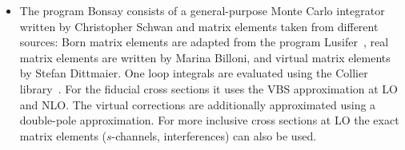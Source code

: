 \documentclass[twocolumn,epjc3]{svjour3} %
\begin{document}
     \begin{itemize} 

    \item The program {\sc Bonsay} consists of a general-purpose Monte Carlo integrator written by Christopher Schwan and matrix elements taken from different sources:
    Born matrix elements are adapted from the program {\sc Lusifer}~\cite{Dittmaier:2002ap}, real matrix elements are written by Marina Billoni, and virtual matrix elements by Stefan Dittmaier.
    One loop integrals are evaluated using the {\sc Collier} library~\cite{Denner:2014gla,Denner:2016kdg}.
    For the fiducial cross sections it uses the VBS approximation at LO and NLO.
    The virtual corrections are additionally approximated using a double-pole approximation.
    For more inclusive cross sections at LO the exact matrix elements ($s$-channels, interferences) can also be used.


\end{itemize}
\end{document}
